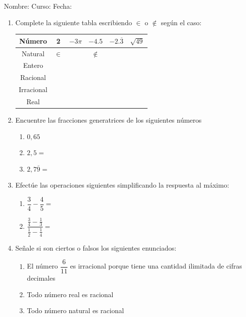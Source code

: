\documentclass[fleqn]{article}
\newcommand{\LineaNombre}{%
\par
\vspace{\baselineskip}
Nombre:\hrulefill \; Curso: \underline{\hspace*{36pt}} \; Fecha: \underline{\hspace*{2.5cm}} \relax
\par}
\begin{document}
\LineaNombre
\begin{enumerate}
   \item Complete la siguiente tabla escribiendo $\in$ o $\not\in$ según el caso:
\begin{center}
   \begin{tabular}{|c|c|c|c|c|c|}
\hline 
Número & 2 & $-3\pi$ & $-4.5$ & $-2.\overline{3}$ & $\sqrt{49}$ \\ 
\hline 
Natural & $\in$ &  & $\not\in$ &  &  \\ 
\hline 
Entero &  &  &  &  &  \\ 
\hline 
Racional &  &  &  &  &  \\ 
\hline 
Irracional &  &  &  &  &  \\ 
\hline 
Real &  &  &  &  &  \\ 
\hline 
\end{tabular} 
\end{center}
 \item Encuentre las fracciones generatrices de los siguientes números
\begin{enumerate}
\item $0,65$\noanswer
\item $2,5=$\noanswer
\item $2,7\overline{9}=$\noanswer
\end{enumerate}
 \item Efectúe las operaciones siguientes simplificando la respuesta al máximo:
 \begin{enumerate}
 \item $\dfrac{3}{4}-\dfrac{4}{5}=$\noanswer
 \item $\dfrac{\frac{3}{4}-\frac{1}{3}}{\frac{1}{2}-\frac{1}{4}}=$\noanswer
 \end{enumerate}
 \newpage
\item Señale si son ciertos o falsos los siguientes enunciados:
\begin{enumerate}
\item El número $\dfrac{6}{11}$ es irracional porque tiene una cantidad ilimitada de cifras decimales \underline{\hspace*{20pt}}
\item Todo número real es racional \underline{\hspace*{20pt}}
\item Todo número natural es racional \underline{\hspace*{20pt}}

\end{enumerate}
\end{enumerate}
\end{document}
